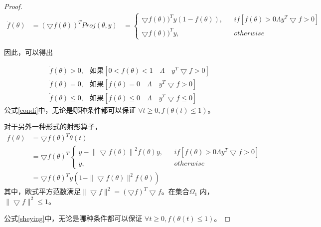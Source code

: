 \begin{lem}
\begin{proof}
\begin{equation}
\begin{aligned}
\dot{f}(\theta)&= (\bigtriangledown f(\theta))^T Proj(\theta,y)
         &= \left\{\begin{matrix}
\bigtriangledown f(\theta))^T y (1-f(\theta)), &  & if [
f(\theta) >0 \Lambda  y^T \bigtriangledown f >0 ] \\
\bigtriangledown f(\theta))^T y , &  & otherwise
\end{matrix}\right.
\end{aligned}
\end{equation}

因此，可以得出

\begin{equation}
\label{condi}
\begin{aligned}
\dot f(\theta) >0 ,&\mbox{如果} [0 < f(\theta) < 1 \quad \Lambda \quad   y^T\bigtriangledown f > 0]\\
\dot f(\theta) = 0, &\mbox{如果} [f(\theta) = 0 \quad \Lambda \quad  y^T\bigtriangledown f >0  ] \\
\dot f(\theta) \leq 0, &\mbox{如果} [f(\theta) \leq 0 \quad \Lambda \quad  y^T\bigtriangledown f \leq 0  ]
\end{aligned}
\end{equation}
公式\ref{condi}中，无论是哪种条件都可以保证 $\forall t \geq 0, f(\theta(t)\leq 1)$。

对于另外一种形式的射影算子，
\begin{equation}
\label{sheying}
\begin{aligned}
\dot f(\theta) &= \bigtriangledown f(\theta)^T \dot \theta (t)\\
  &=\bigtriangledown f(\theta)^T \left\{\begin{matrix}
  y - {\| \bigtriangledown f(\theta) \|}^2  f(\theta) y ,&  & if [
f(\theta) >0 \Lambda  y^T \bigtriangledown f >0 ]     \\
  y  ,&  & otherwise
\end{matrix}\right.\\
&= \bigtriangledown f(\theta)^T y (1- \|\bigtriangledown f(\theta)\|^2 f(\theta))
\end{aligned}
\end{equation}
其中，欧式平方范数满足$\| \bigtriangledown f \|^2 = (\bigtriangledown f)^T \bigtriangledown f$。在集合$\Omega_1$ 内， $\| \bigtriangledown f \|^2 \leq 1$。

公式\ref{sheying}中，无论是哪种条件都可以保证 $\forall t \geq 0, f(\theta(t)\leq 1)$。
\end{proof}
\end{lem}

